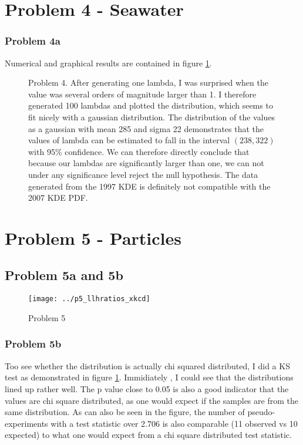 \documentclass[a4paper,11pt]{article}
\begin{document}
\section{Problem 4 - Seawater}
\subsubsection{Problem 4a}
Numerical and graphical results are contained in figure \ref{p4_seawater}.


\begin{figure}[H]
  \centering
  \caption{Problem 4.
  After generating one lambda, I was surprised when the value was several orders of magnitude larger than 1.
  I therefore generated 100 lambdas and plotted the distribution, which seems to fit nicely with a gaussian distribution.
The distribution of the values as a gaussian with mean 285 and sigma 22 demonstrates that the values of lambda can be estimated to fall in the interval $(238, 322)$ with 95\% confidence.
We can therefore directly conclude that because our lambdas are significantly larger than one, we can not under any significance level reject the null hypothesis.
The data generated from the 1997 KDE is definitely not compatible with the 2007 KDE PDF. }
  \label{p4_seawater}
\end{figure}

\section{Problem 5 - Particles}
\subsection{Problem 5a and 5b}
\begin{figure}[H]
  \texttt{[image: ../p5\_llhratios\_xkcd]}
  \caption{Problem 5}
  \label{p5_llhratios}
\end{figure}

\subsubsection{Problem 5b}
Too see whether the distribution is actually chi squared distributed, I did a KS test as demonstrated in figure \ref{p4_seawater}.
Immidiately , I could see that the distributions lined up rather well.
The p value close to 0.05 is also a good indicator that the values are chi square distributed, as one would expect if the samples are from the same distribution.
As can also be seen in the figure, the number of pseudo-experiments with a test statistic over 2.706 is also comparable (11 observed vs 10 expected) to what one would expect from a chi square distributed test statistic.
\end{document}
